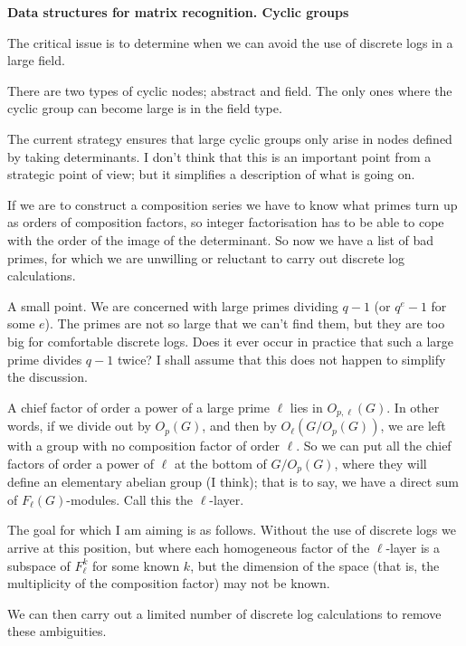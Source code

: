 \def\GL{{\rm GL}}
\def\GF{{\rm GF}}
\def\SL{{\rm SL}}
\centerline{\bf Data structures for matrix recognition.  Cyclic groups}
\medskip
The critical issue is to determine when we can avoid the use of discrete logs in a large field.

There are two types of cyclic nodes; abstract and field.  The only ones where the cyclic group can
become large is in the field type.

The current strategy ensures that large cyclic groups only arise in nodes defined by taking determinants.
I don't think that this is an important point from a strategic point of view; but it simplifies a description
of what is going on.

If we are to construct a composition series we have to know what primes turn up as orders of composition factors, so integer factorisation has to be able to cope
with the order of the image of the determinant.  So now we have a list of bad primes, for which we are
unwilling or reluctant to carry out discrete log calculations.  

A small point.  We are concerned with large primes dividing $q-1$ (or $q^e-1$ for some $e$).  The
primes are not so large that we can't find them, but they are too big for comfortable discrete logs.
 Does it ever occur in practice that such a large
prime divides $q-1$ twice?  I shall assume that this does not happen to simplify the discussion.

A chief factor of order a power of a large prime $\ell$ lies in $O_{p,\ell}(G)$.  In other words, if we divide
out by $O_p(G)$, and then by $O_\ell(G/O_p(G))$, we are left with a group with no composition
factor of order  $\ell$.
So we can put all the chief factors of order a power of $\ell$ at the bottom of $G/O_p(G)$, where
they will define an elementary abelian group (I think); that is to say, we have a direct sum of
$F_\ell(G)$-modules.  Call this the $\ell$-layer.

The goal for which I am aiming is as follows.  Without the use of discrete logs we arrive at this position,
but where each homogeneous factor of the $\ell$-layer is a subspace of $F_\ell^k$ for some known $k$, but the dimension of the space (that is, the multiplicity of the composition factor) may not be known.

We can then carry out a limited number of discrete log calculations to remove these ambiguities.

